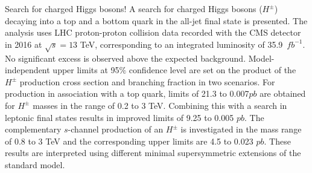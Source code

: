 \begin{MyArticleDotted}[enhanced, tikz={rotate=0}]{Search for charged Higgs bosons!} %
    A search for charged Higgs bosons ($H^{\pm}$) decaying into a top
    and a bottom quark in the all-jet final state is presented. The
    analysis uses LHC proton-proton collision data recorded with the
    CMS detector in 2016 at $\sqrt{s} = 13$ TeV, corresponding to an
    integrated luminosity of 35.9~$fb^{-1}$. No significant excess is
    observed above the expected background. Model-independent upper
    limits at 95$\%$ confidence level are set on the product of the
    $H^{\pm}$ production cross section and branching fraction in two
    scenarios.  For production in association with a top quark,
    limits of 21.3 to 0.007$pb$ are obtained for $H^{\pm}$ masses in the
    range of 0.2 to 3 TeV. Combining this with a search in leptonic
    final states results in improved limits of 9.25 to 0.005 $pb$. The
    complementary $s$-channel production of an $H^{\pm}$ is
    investigated in the mass range of 0.8 to 3 TeV and the
    corresponding upper limits are 4.5 to 0.023 $pb$. These results are
    interpreted using different minimal supersymmetric extensions of
    the standard model.
\end{MyArticleDotted}
